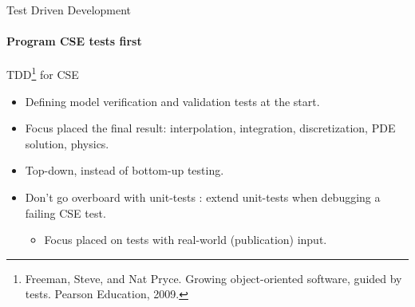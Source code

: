 \documentclass[
	ngerman,%
	aspectratio=169,%
	color={accentcolor=2d},
	logo=true,%
	colorframetitle=true,%
	]{tudabeamer}
\begin{document}
\begin{frame}{Test Driven Development} 
    \framesubtitle{Program CSE tests first}
        \vfill


        TDD\footnote{Freeman, Steve, and Nat Pryce. Growing object-oriented software, guided by tests. Pearson Education, 2009.} for CSE
        \begin{itemize}
            \item Defining model verification and validation tests at the start.
            \item Focus placed the final result: interpolation, integration, discretization, PDE solution, physics. 
            \item Top-down, instead of bottom-up testing.
            \item Don't go overboard with unit-tests \faGraduationCap: extend unit-tests when debugging a failing CSE test.  
                \begin{itemize}
                    \item Focus placed on tests with real-world (publication) input. 
                \end{itemize}
        \end{itemize}

\end{frame}
\end{document}

